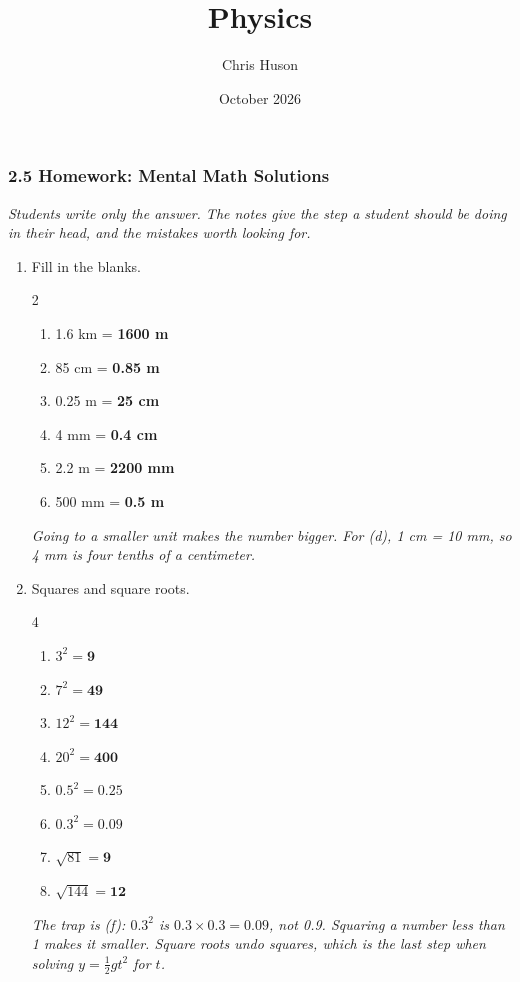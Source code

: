 \documentclass[12pt, twoside]{article}
\title{Physics}
\author{Chris Huson}
\date{October 2026}
\begin{document}
\subsubsection*{2.5 Homework: Mental Math Solutions}

\emph{Students write only the answer. The notes give the step a student should be
doing in their head, and the mistakes worth looking for.}

\begin{enumerate}[itemsep=0.3cm]

\item Fill in the blanks.
  \begin{multicols}{2}
    \begin{enumerate}[itemsep=0.1cm]
      \item 1.6 km = \textbf{1600 m}
      \item 85 cm = \textbf{0.85 m}
      \item 0.25 m = \textbf{25 cm}
      \item 4 mm = \textbf{0.4 cm}
      \item 2.2 m = \textbf{2200 mm}
      \item 500 mm = \textbf{0.5 m}
    \end{enumerate}
  \end{multicols}
  \emph{Going to a smaller unit makes the number bigger. For (d), 1 cm = 10 mm, so
  4 mm is four tenths of a centimeter.}

\item Squares and square roots.
  \begin{multicols}{4}
    \begin{enumerate}[itemsep=0.1cm]
      \item $3^2 = \mathbf{9}$
      \item $7^2 = \mathbf{49}$
      \item $12^2 = \mathbf{144}$
      \item $20^2 = \mathbf{400}$
      \item $0.5^2 = \mathbf{0.25}$
      \item $0.3^2 = \mathbf{0.09}$
      \item $\sqrt{81} = \mathbf{9}$
      \item $\sqrt{144} = \mathbf{12}$
    \end{enumerate}
  \end{multicols}
  \emph{The trap is (f): $0.3^2$ is $0.3 \times 0.3 = 0.09$, not 0.9. Squaring a number
  less than 1 makes it smaller. Square roots undo squares, which is the last step
  when solving $y = \frac{1}{2}gt^2$ for $t$.}


\end{enumerate}
\end{document}
